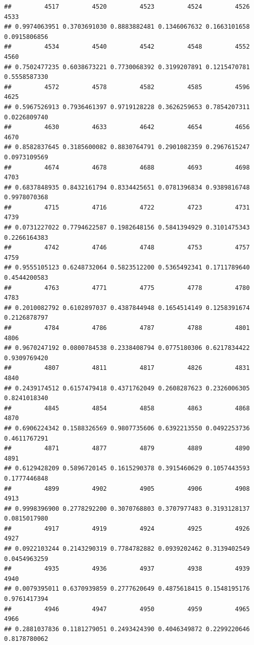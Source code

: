 \documentclass[
]{article}
\begin{document}
\begin{verbatim}
##         4517         4520         4523         4524         4526         4533 
## 0.9974063951 0.3703691030 0.8883882481 0.1346067632 0.1663101658 0.0915806856 
##         4534         4540         4542         4548         4552         4560 
## 0.7502477235 0.6038673221 0.7730068392 0.3199207891 0.1215470781 0.5558587330 
##         4572         4578         4582         4585         4596         4625 
## 0.5967526913 0.7936461397 0.9719128228 0.3626259653 0.7854207311 0.0226809740 
##         4630         4633         4642         4654         4656         4670 
## 0.8582837645 0.3185600082 0.8830764791 0.2901082359 0.2967615247 0.0973109569 
##         4674         4678         4688         4693         4698         4703 
## 0.6837848935 0.8432161794 0.8334425651 0.0781396834 0.9389816748 0.9978070368 
##         4715         4716         4722         4723         4731         4739 
## 0.0731227022 0.7794622587 0.1982648156 0.5841394929 0.3101475343 0.2266164383 
##         4742         4746         4748         4753         4757         4759 
## 0.9555105123 0.6248732064 0.5823512200 0.5365492341 0.1711789640 0.4544200583 
##         4763         4771         4775         4778         4780         4783 
## 0.2010082792 0.6102897037 0.4387844948 0.1654514149 0.1258391674 0.2126878797 
##         4784         4786         4787         4788         4801         4806 
## 0.9670247192 0.0800784538 0.2338408794 0.0775180306 0.6217834422 0.9309769420 
##         4807         4811         4817         4826         4831         4840 
## 0.2439174512 0.6157479418 0.4371762049 0.2608287623 0.2326006305 0.8241018340 
##         4845         4854         4858         4863         4868         4870 
## 0.6906224342 0.1588326569 0.9807735606 0.6392213550 0.0492253736 0.4611767291 
##         4871         4877         4879         4889         4890         4891 
## 0.6129428209 0.5896720145 0.1615290378 0.3915460629 0.1057443593 0.1777446848 
##         4899         4902         4905         4906         4908         4913 
## 0.9998396900 0.2778292200 0.3070768803 0.3707977483 0.3193128137 0.0815017980 
##         4917         4919         4924         4925         4926         4927 
## 0.0922103244 0.2143290319 0.7784782882 0.0939202462 0.3139402549 0.0454963259 
##         4935         4936         4937         4938         4939         4940 
## 0.0079395011 0.6370939859 0.2777620649 0.4875618415 0.1548195176 0.9761417394 
##         4946         4947         4950         4959         4965         4966 
## 0.2881037836 0.1181279051 0.2493424390 0.4046349872 0.2299220646 0.8178780062 

\end{verbatim}
\end{document}
